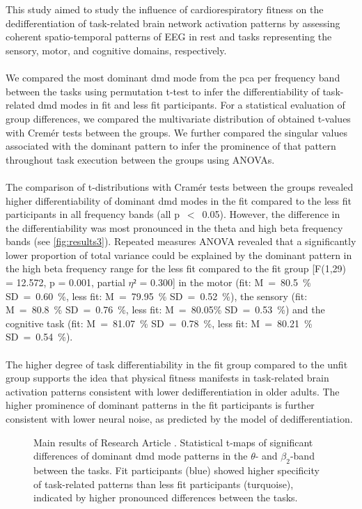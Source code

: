 \hyperref[pub:paperIII]{}\\
\\
This study aimed to study the influence of cardiorespiratory fitness on the dedifferentiation of task-related brain network activation patterns by assessing coherent spatio-temporal patterns of EEG in rest and tasks representing the sensory, motor, and cognitive domains, respectively.\\
\\
We compared the most dominant \gls{dmd} mode from the \gls{pca} per frequency band between the tasks using permutation t-test to infer the differentiability of task-related \gls{dmd} modes in fit and less fit participants. For a statistical evaluation of group differences, we compared the multivariate distribution of obtained t-values with Cremér tests between the groups. We further compared the singular values associated with the dominant pattern to infer the prominence of that pattern throughout task execution between the groups using ANOVAs.\\
\\
The comparison of t-distributions with Cramér tests between the groups revealed higher differentiability of dominant \gls{dmd} modes in the fit compared to the less fit participants in all frequency bands (all p~$<$~0.05). However, the difference in the differentiability was most pronounced in the theta and high beta frequency bands (see \autoref{fig:results3}). Repeated measures ANOVA revealed that a significantly lower proportion of total variance could be explained by the dominant pattern in the high beta frequency range for the less fit compared to the fit group [F(1,29) = 12.572, p = 0.001, partial $\eta²$ = 0.300] in the motor (fit: M~=~80.5~\% SD~=~0.60~\%, less fit: M~=~79.95~\% SD~=~0.52~\%), the sensory (fit: M~=~80.8~\% SD~=~0.76~\%, less fit: M~=~80.05\% SD~=~0.53~\%) and the cognitive task (fit: M~=~81.07~\% SD~=~0.78~\%, less fit: M~=~80.21~\% SD~=~0.54~\%).\\
\\
The higher degree of task differentiability in the fit group compared to the unfit group supports the idea that physical fitness manifests in task-related brain activation patterns consistent with lower dedifferentiation in older adults. The higher prominence of dominant patterns in the fit participants is further consistent with lower neural noise, as predicted by the model of dedifferentiation.

\begin{figure}[ht]
    \centering
    
    \caption[Main results of Research Article ]{Main results of Research Article . Statistical t-maps of significant differences of dominant \gls{dmd} mode patterns in the $\theta$- and $\beta_2$-band between the tasks. Fit participants (blue) showed higher specificity of task-related patterns than less fit participants (turquoise), indicated by higher pronounced differences between the tasks.}
    \label{fig:results3}
\end{figure}

